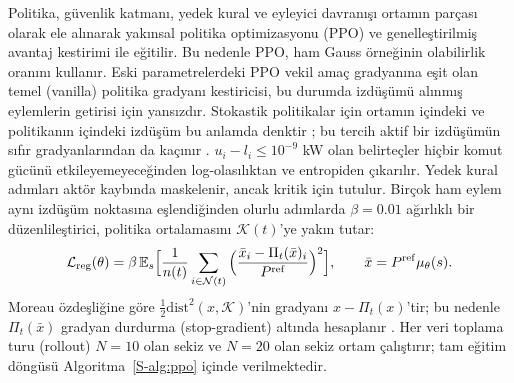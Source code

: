 Politika, güvenlik katmanı, yedek kural ve eyleyici davranışı ortamın parçası olarak ele alınarak yakınsal politika optimizasyonu (PPO) \cite{schulman2017proximal} ve genelleştirilmiş avantaj kestirimi \cite{schulman2016highdimensional} ile eğitilir.
Bu nedenle PPO, ham Gauss örneğinin olabilirlik oranını kullanır.
Eski parametrelerdeki PPO vekil amaç gradyanına eşit olan temel (vanilla) politika gradyanı kestiricisi, bu durumda izdüşümü alınmış eylemlerin getirisi için yansızdır.
Stokastik politikalar için ortamın içindeki ve politikanın içindeki izdüşüm bu anlamda denktir \cite{markgraf2025safe}; bu tercih aktif bir izdüşümün sıfır gradyanlarından da kaçınır \cite{kasaura2023benchmarking}.
$u_i-l_i\le10^{-9}$ kW olan belirteçler hiçbir komut gücünü etkileyemeyeceğinden log-olasılıktan ve entropiden çıkarılır.
Yedek kural adımları aktör kaybında maskelenir, ancak kritik için tutulur.
Birçok ham eylem aynı izdüşüm noktasına eşlendiğinden olurlu adımlarda $\beta=0.01$ ağırlıklı bir düzenlileştirici, politika ortalamasını $\mathcal K(t)$'ye yakın tutar:
\begin{equation}\label{eq:reg}
\mathcal L_{\mathrm{reg}}(\theta)=\beta\,\mathbb E_{s}\Big[\frac1{n(t)}\sum_{i\in\mathcal N(t)}\Big(\frac{\bar x_i-\Pi_t(\bar x)_i}{P^{\mathrm{ref}}}\Big)^{2}\Big],\qquad \bar x=P^{\mathrm{ref}}\mu_\theta(s).
\end{equation}
Moreau özdeşliğine göre $\tfrac12\mathrm{dist}^2(x,\mathcal K)$'nin gradyanı $x-\Pi_t(x)$'tir; bu nedenle $\Pi_t(\bar x)$ gradyan durdurma (stop-gradient) altında hesaplanır \cite{chen2021enforcing,markgraf2025safe}.
Her veri toplama turu (rollout) $N=10$ olan sekiz ve $N=20$ olan sekiz ortam çalıştırır; tam eğitim döngüsü Algoritma~\ref{S-alg:ppo} içinde verilmektedir.

